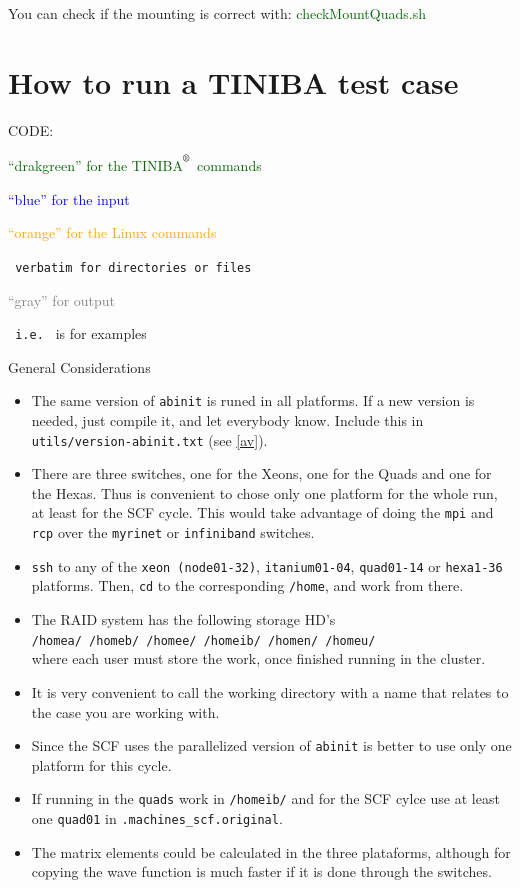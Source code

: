 \documentclass[openany,oneside]{book}
\def\reg{\textsuperscript{\textregistered}}
\numberwithin{equation}{section}
\begin{document}
You can check if the mounting is correct with:
\textcolor{darkgreen}{checkMountQuads.sh} 

\chapter{How to run a TINIBA test case}

CODE:

\textcolor{darkgreen}{``drakgreen'' for the TINIBA$^{\reg}$ commands}

\textcolor{blue}{``blue'' for the input}

\textcolor{orange}{``orange'' for the Linux commands}

\verb= verbatim for directories or files=

\textcolor{gray}{``gray'' for output}

\verb= i.e. = is for examples\\

\centerline{General Considerations}
\begin{itemize}
\item The same version of \verb=abinit= is runed in all platforms. If
  a new version is needed, just compile it, and let everybody
  know. Include this in \verb=utils/version-abinit.txt= (see \ref{av}).

\item There are three switches, one for the Xeons, one for the Quads
  and one for the Hexas. Thus is convenient to chose only one platform
  for the whole run, at least for the SCF cycle. This would take
  advantage of doing the \verb=mpi= and \verb=rcp= over the
  \verb=myrinet= or \verb=infiniband= switches.
\item \verb=ssh= to any of the \verb=xeon (node01-32)=, \verb=itanium01-04=,
  \verb=quad01-14= or \verb=hexa1-36= platforms. Then, \verb=cd= to the
  corresponding \verb=/home=, and work from there.
\item The RAID system has the following storage HD's\\
 \verb=/homea/ /homeb/ /homee/ /homeib/ /homen/ /homeu/=\\
where each user must store the work, once finished running in the cluster. 
\item It is very convenient to call the working directory with a
name that relates to the case you are working with. 
\item Since the SCF uses the parallelized version of \verb=abinit= is
  better to use only one platform for this cycle.
\item If running in the \verb=quads= work in \verb=/homeib/=
and for the SCF cylce use at least
one \verb=quad01= in \verb=.machines_scf.original=.
\item The matrix elements could be calculated in the three plataforms,
  although for copying the wave function is much faster if it is done
  through the switches.  

\end{itemize}
\end{document}
